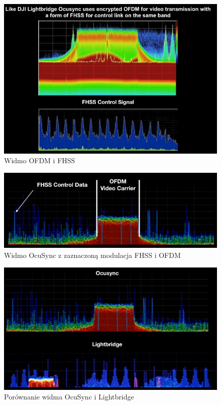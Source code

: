 \documentclass[12pt, a4paper, twoside]{report}
\begin{document}
\begin{figure}[!htbp]
\centering
\includegraphics[width=14cm]{Obrazy/ocusync_spectrum_1.png}
\caption{Widmo OFDM i FHSS\cite{ocusync-yt}}
\end{figure}

\begin{figure}[!htbp]
\centering
\includegraphics[width=14cm]{Obrazy/ocusync_spectrum_2.png}
\caption{Widmo OcuSync z zaznaczoną modulacja FHSS i OFDM\cite{ocusync-yt}}
\end{figure}


\begin{figure}[!htbp]
\centering
\includegraphics[width=14cm]{Obrazy/ocusync_vs_lightbridge.png}
\caption{Porównanie widma OcuSync i Lightbridge \cite{ocusync-yt}}
\end{figure}
\end{document}

